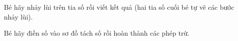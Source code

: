 \documentclass[../main.tex]{subfiles}
\begin{document}
\newpage

\begin{bt}
    Bé hãy nhảy lùi trên tia số rồi viết kết quả (hai tia số cuối bé tự vẽ các bước nhảy lùi).
    \TTbatdauhinh
    {\centering
    \begin{minipage}{0.49\linewidth}\centering{}\par\vspace{2pt}\end{minipage}\hfill
    \begin{minipage}{0.49\linewidth}\centering{}\par\vspace{2pt}\end{minipage}\par
    \vspace{14pt}
    \begin{minipage}{0.49\linewidth}\centering{}\par\vspace{2pt}\end{minipage}\hfill
    \begin{minipage}{0.49\linewidth}\centering{}\par\vspace{2pt}\end{minipage}\par}
\end{bt}

\begin{bt}
    Bé hãy điền số vào sơ đồ tách số rồi hoàn thành các phép trừ.
    \TTbatdauhinh
    {\centering
    \begin{minipage}{0.32\linewidth}\centering{}\par\vspace{4pt}\par\vspace{4pt}\end{minipage}\hfill
    \begin{minipage}{0.32\linewidth}\centering{}\par\vspace{4pt}\par\vspace{4pt}\end{minipage}\hfill
    \begin{minipage}{0.32\linewidth}\centering{}\par\vspace{4pt}\par\vspace{4pt}\end{minipage}\par}
\end{bt}
\end{document}
